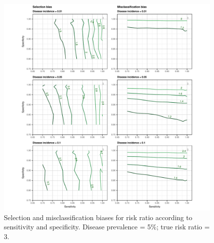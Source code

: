 \documentclass[utf8]{frontiers_suppmat} %
\begin{document}
\begin{figure}[htbp]
  \begin{center}
    \includegraphics[scale=.95]{master-risk5_contourX-1}
    \end{center}
  \caption{Selection and misclassification biases for risk ratio according
    to sensitivity and specificity. Disease prevalence = 5\%; true risk ratio =
    3.}
  \label{fig:risk_contourX5}
\end{figure}
\end{document}
